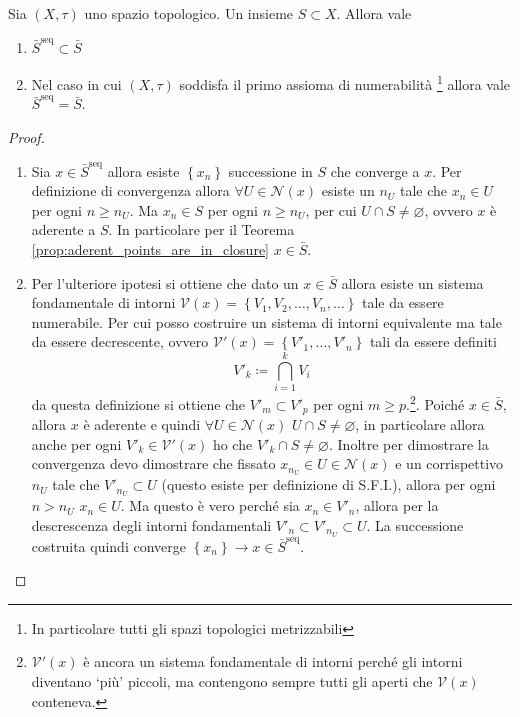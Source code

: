 \begin{theorem}
	Sia $(X,\tau)$ uno spazio topologico. Un insieme $S \subset X$. Allora vale 
	\begin{enumerate}
		\item $\bar{S}^\text{seq} \subset \bar{S}$
		\item Nel caso in cui $(X, \tau)$ soddisfa il primo assioma di numerabilità \footnote{In particolare tutti gli spazi topologici metrizzabili} allora vale $\bar{S}^\text{seq} = \bar{S}$.
	\end{enumerate}
\end{theorem}
\begin{proof}
	\begin{enumerate}
		\item Sia $x \in \bar{S}^\text{seq}$ allora esiste $\left\{x_n\right\}$ successione in $S$ che converge a $x$. Per definizione di convergenza allora $\forall U \in \mathcal{N}(x)$ esiste un $n_U$ tale che $x_n \in U$ per ogni $n \ge n_U$. Ma $x_n \in S$ per ogni $n \ge n_U$, per cui $U \cap S \neq \varnothing$, ovvero $x$ è aderente a $S$. In particolare per il Teorema \ref{prop:aderent_points_are_in_closure} $x \in \bar{S}$. 
		\item Per l'ulteriore ipotesi si ottiene che dato un $x \in \bar{S}$ allora esiste un sistema fondamentale di intorni $\mathcal{V}(x) = \left\{V_1, V_2, \dots, V_n, \dots\right\}$ tale da essere numerabile. Per cui posso costruire un sistema di intorni equivalente ma tale da essere decrescente, ovvero $\mathcal{V}'(x) = \left\{V'_1, \dots, V'_n\right\}$ tali da essere definiti 
		\begin{equation*}
			V'_k \coloneqq \bigcap^k_{i=1} V_i
		\end{equation*}
		da questa definizione si ottiene che $V'_{m} \subset V'_p$ per ogni $m \ge p$.\footnote{$\mathcal{V}'(x)$ è ancora un sistema fondamentale di intorni perché gli intorni diventano `più' piccoli, ma contengono sempre tutti gli aperti che $\mathcal{V}(x)$ conteneva.}.
		Poiché $x \in \bar{S}$, allora $x$ è aderente e quindi $\forall U \in \mathcal{N}(x)$ $U \cap S \neq \varnothing$, in particolare allora anche per ogni $V'_k \in \mathcal{V}'(x)$ ho che $V'_k \cap S \neq \varnothing$. Inoltre per dimostrare la convergenza devo dimostrare che fissato $x_{n_U} \in U \in \mathcal{N}(x)$ e un corrispettivo $n_U$ tale che $V'_{n_U} \subset U$ (questo esiste per definizione di S.F.I.), allora per ogni $n > n_U$ $x_n \in U$. Ma questo è vero perché sia $x_n \in V'_n$, allora per la descrescenza degli intorni fondamentali $V'_{n} \subset V'_{n_U} \subset U$. La successione costruita quindi converge $\left\{x_n\right\} \rightarrow x \in \bar{S}^\text{seq}$.
	\end{enumerate}
\end{proof}


